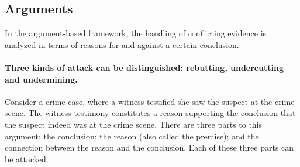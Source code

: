 \documentclass[10pt]{article}
\begin{document}


\subsection{Arguments}
\label{sec:confArg}


In the argument-based framework, the handling of conflicting evidence is analyzed 
in terms of reasons for and against a certain conclusion.


\paragraph{Three kinds of attack can be distinguished: rebutting, undercutting and undermining.}

Consider a crime case, where a witness testified she saw the suspect at the crime scene. The witness testimony constitutes a 
reason supporting the conclusion that the suspect indeed was at the crime scene. There are three parts to this argument: the conclusion; the reason (also called the premise); and the connection between the reason and the conclusion.
Each of these three parts can be attacked. %
\end{document}
